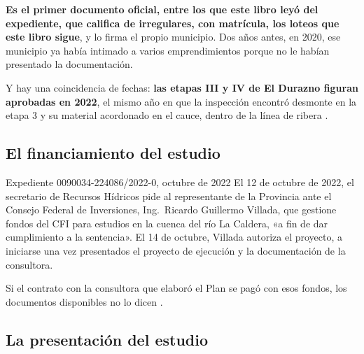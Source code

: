 \begin{cautela}
\textbf{Es el primer documento oficial, entre los que este libro leyó del expediente, que califica de irregulares, con matrícula, los loteos que este libro sigue}, y lo firma el propio municipio. Dos años antes, en 2020, ese municipio ya había intimado a varios emprendimientos porque no le habían presentado la documentación.

Y hay una coincidencia de fechas: \textbf{las etapas III y IV de El Durazno figuran aprobadas en 2022}, el mismo año en que la inspección encontró desmonte en la etapa 3 y su material acordonado en el cauce, dentro de la línea de ribera .
\end{cautela}

\subsection*{El financiamiento del estudio}

\begin{ficha}{Expediente 0090034-224086/2022-0, octubre de 2022}
El 12 de octubre de 2022, el secretario de Recursos Hídricos pide al representante de la Provincia ante el Consejo Federal de Inversiones, Ing.\ Ricardo Guillermo Villada, que gestione fondos del CFI para estudios en la cuenca del río La Caldera, «a fin de dar cumplimiento a la sentencia». El 14 de octubre, Villada autoriza el proyecto, a iniciarse una vez presentados el proyecto de ejecución y la documentación de la consultora.
\end{ficha}

Si el contrato con la consultora que elaboró el Plan se pagó con esos fondos, los documentos disponibles no lo dicen .

\subsection*{La presentación del estudio}

